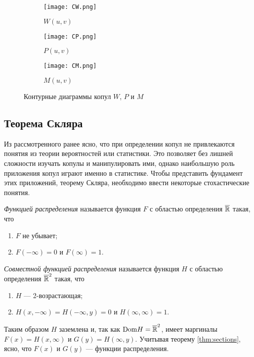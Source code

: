 \begin{figure}[H]
	\centering
	\begin{subfigure}{.3\textwidth}
		\centering
		\texttt{[image: CW.png]}
		\caption{$W(u, v)$}
	\end{subfigure}%
	\begin{subfigure}{.3\textwidth}
		\centering
		\texttt{[image: CP.png]}
		\caption{$P(u, v)$}
	\end{subfigure}
	\begin{subfigure}{.3\textwidth}
		\centering
		\texttt{[image: CM.png]}
		\caption{$M(u, v)$}
	\end{subfigure}
	\caption{Контурные диаграммы копул $W$, $P$ и $M$}
\end{figure}

\subsection*{Теорема Скляра}

Из рассмотренного ранее ясно, что при определении копул не привлекаются понятия из теории вероятностей или статистики. Это позволяет без лишней сложности изучать копулы и манипулировать ими, однако наибольшую роль приложения копул играют именно в статистике. Чтобы представить фундамент этих приложений, теорему Скляра, необходимо ввести некоторые стохастические понятия.

\begin{define}
	\emph{Функцией распределения} называется функция $F$ с областью определения $\overline{\mathbb{R}}$ такая, что
	\begin{enumerate}
	\item $F$ не убывает;
	\item $F(-\infty) = 0$ и $F(\infty) = 1$.
	\end{enumerate}
\end{define}

\begin{define}
	\emph{Совместной функцией распределения} называется функция $H$ с областью определения $\overline{\mathbb{R}}^2$ такая, что
	\begin{enumerate}
	\item $H$ --- 2-возрастающая;
	\item $H(x, -\infty) = H(-\infty, y) = 0$ и $H(\infty, \infty) = 1$.
	\end{enumerate}
\end{define}

Таким образом $H$ заземлена и, так как $\mathrm{Dom}{H} = \overline{\mathbb{R}}^2$, имеет маргиналы $F(x) = H(x, \infty)$ и $G(y) = H(\infty, y)$. Учитывая теорему \ref{thm:sections}, ясно, что $F(x)$ и $G(y)$ --- функции распределения.


